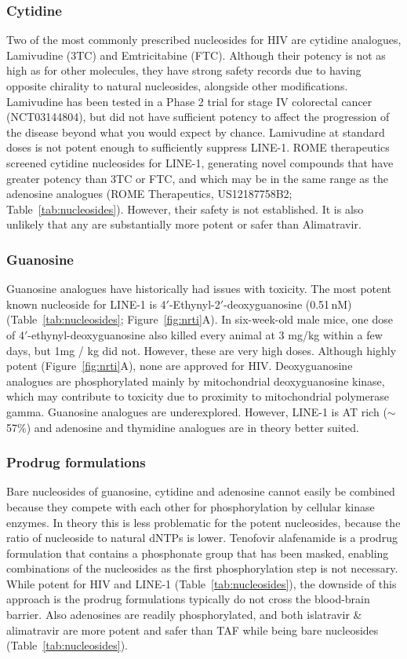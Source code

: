 \documentclass[11pt,twocolumn,twoside]{extarticle}
\begin{document}
\subsubsection{Cytidine}
Two of the most commonly prescribed nucleosides for HIV are cytidine analogues, Lamivudine (3TC) and Emtricitabine (FTC). Although their potency is not as high as for other molecules, they have strong safety records due to having opposite chirality to natural nucleosides, alongside other modifications\cite{coates}. Lamivudine has been tested in a Phase 2 trial for stage IV colorectal cancer (NCT03144804), but did not have sufficient potency to affect the progression of the disease beyond what you would expect by chance\cite{rajurkar}. Lamivudine at standard doses is not potent enough to sufficiently suppress LINE-1. ROME therapeutics screened cytidine nucleosides for LINE-1, generating novel compounds that have greater potency than 3TC or FTC, and which may be in the same range as the adenosine analogues (ROME Therapeutics, US12187758B2; Table~\ref{tab:nucleosides}). However, their safety is not established. It is also unlikely that any are substantially more potent or safer than Alimatravir.

\subsubsection{Guanosine}
Guanosine analogues have historically had issues with toxicity. The most potent known nucleoside for LINE-1 is 4$'$-Ethynyl-2$'$-deoxyguanosine (0.51\,nM) (Table~\ref{tab:nucleosides}; Figure~\ref{fig:nrti}A). In six-week-old male mice, one dose of 4$'$-ethynyl-deoxyguanosine also killed every animal at 3 mg/kg within a few days\cite{ohrui}, but 1mg / kg did not. However, these are very high doses. Although highly potent (Figure~\ref{fig:nrti}A), none are approved for HIV. Deoxyguanosine analogues are phosphorylated mainly by mitochondrial deoxyguanosine kinase, which may contribute to toxicity due to proximity to mitochondrial polymerase gamma. Guanosine analogues are underexplored. However, LINE-1 is AT rich ($\sim$57\%) and adenosine and thymidine analogues are in theory better suited.

\subsubsection{Prodrug formulations}
Bare nucleosides of guanosine, cytidine and adenosine cannot easily be combined because they compete with each other for phosphorylation by cellular kinase enzymes\cite{arner}. In theory this is less problematic for the potent nucleosides, because the ratio of nucleoside to natural dNTPs is lower. Tenofovir alafenamide is a prodrug formulation that contains a phosphonate group that has been masked, enabling combinations of the nucleosides as the first phosphorylation step is not necessary. While potent for HIV and LINE-1\cite{callebaut} (Table~\ref{tab:nucleosides}), the downside of this approach is the prodrug formulations typically do not cross the blood-brain barrier\cite{best}. Also adenosines are readily phosphorylated, and both islatravir \& alimatravir are more potent and safer than TAF while being bare nucleosides (Table~\ref{tab:nucleosides}).
\end{document}
